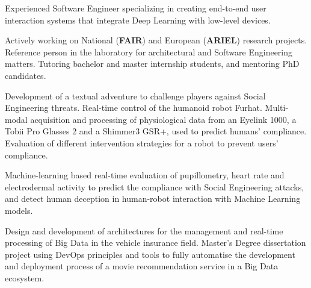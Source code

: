 \documentclass[10pt,a4paper,ragged2e]{altacv}
\begin{document}


\begin{fullwidth}
\makecvheader
\end{fullwidth}


Experienced Software Engineer specializing in creating end-to-end user interaction systems that integrate Deep Learning with low-level devices.


    Actively working on National (\textbf{FAIR}) and European (\textbf{ARIEL}) research projects. Reference person in the laboratory for architectural and Software Engineering matters. Tutoring bachelor and master internship students, and mentoring PhD candidates.

    \divider    
    
    Development of a textual adventure to challenge players against Social Engineering threats. Real-time control of the humanoid robot Furhat. Multi-modal acquisition and processing of physiological data from an Eyelink 1000, a Tobii Pro Glasses 2 and a Shimmer3 GSR+, used to predict humans' compliance. Evaluation of different intervention strategies for a robot to prevent users' compliance.

    \divider    
    
    Machine-learning based real-time evaluation of pupillometry, heart rate and electrodermal activity to predict the compliance with Social Engineering attacks, and detect human deception in human-robot interaction with Machine Learning models.

    \divider    
    
    Design and development of architectures for the management and real-time processing of Big Data in the vehicle insurance field. Master's Degree dissertation project using DevOps principles and tools to fully automatise the development and deployment process of a movie recommendation service in a Big Data ecosystem.
\end{document}
